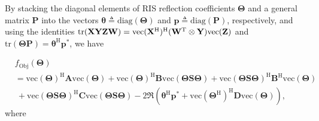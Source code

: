 \documentclass[journal]{IEEEtran}
\begin{document}
\vspace{-2.8mm}
    
By  stacking   the diagonal elements of  RIS reflection coefficients $\mathbf {\Theta}$ and a general matrix $\mathbf {P}$  into  the vectors $\boldsymbol {\theta } \triangleq {\mathrm {diag}(\mathbf {\Theta})}$ and $\mathbf {p } \triangleq{\mathrm {diag}(\mathbf {P})}$, respectively, 
and using the identities
 $\mathrm {tr}(\bf {X} \bf {Y} \bf {Z} \bf {W})=\mathrm {vec}(\bf {X}^{ \mathrm {H} })^{ \mathrm {H} }(\bf {W}^{\mathrm {T}} \otimes \bf {Y}) \mathrm {vec}(\bf {Z})$ and $\mathrm {tr}(\boldsymbol {\Theta }\mathbf{P})=\boldsymbol {\theta }^{\mathrm{H}}{{\mathbf{p}}^{\ast}}$, 
we have

\vspace{-4mm}

\begin{equation}\begin{aligned} &f_{\mathrm{ Obj}} ( \boldsymbol {\Theta }) 
     \\&  \!\! =\! \!\mathrm {vec}(\!\boldsymbol {\Theta }\!)^{\mathrm{\!H}}\!\mathbf{A}\!\mathrm {vec}(\!\boldsymbol {\Theta }\!)\!\!+\!\!\mathrm {vec}(\!\boldsymbol {\Theta }\!)^{\mathrm{H}}\mathbf{B}\mathrm {vec}(\!\boldsymbol {\Theta }\mathbf{S} \boldsymbol {\Theta }\!)
        \!\!+\!\!\mathrm {vec}(\!\boldsymbol {\Theta }\mathbf{S} \boldsymbol {\Theta }\!)^{\mathrm{H}}\mathbf{B}^{\mathrm{H}}\mathrm {vec}(\!\boldsymbol {\Theta }\!)
       \\& \ +\!\!\mathrm {vec}(\!\boldsymbol {\Theta }\mathbf{S} \boldsymbol {\Theta }\!)^{\mathrm{H}}\mathbf{C}\mathrm {vec}(\!\boldsymbol {\Theta }\mathbf{S} \boldsymbol {\Theta }\!)
    \!  \! -\!\!2{\Re}(\boldsymbol {\theta }^{\mathrm{H}}{{\mathbf{p}}^{\ast}}\!\!+\!\!\mathrm {vec}(\!\boldsymbol {\Theta }^{\mathrm{H}}\!)^{\mathrm{H}}\mathbf{D}\mathrm {vec}(\!\boldsymbol {\Theta }\!)\!),
  \label{11}  \end{aligned}\end{equation}
where 

\vspace{-4mm}
\end{document}
